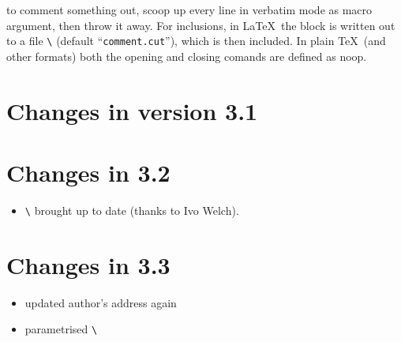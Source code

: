 \documentclass[parskip=false, DIV=8, headings=normal, pagesize=auto]{scrartcl}
\makeatletter
\newcommand*{\cs}[1]{\texttt{\textbackslash#1}}
\newcommand*{\cmd}[1]{\cs{\expandafter\@gobble\string#1}}
\newcommand*{\meta}[1]{\textlangle\textsl{#1}\textrangle}
\newcommand*{\marg}[1]{\texttt{\{}\meta{#1}\texttt{\}}}
\makeatother
\begin{document}
to comment something out, scoop up  every line in verbatim mode
as macro argument, then throw it away.
For inclusions, in \LaTeX\ the block is written out to
a file \cmd{\CommentCutFile} (default ``\texttt{comment.cut}''), which is
then included.
In plain \TeX\ (and other formats) both the opening and
closing comands are defined as noop.


\section{Changes in version 3.1}



\section{Changes in 3.2}

\begin{itemize}
\item \cmd{\specialcomment} brought up to date (thanks to Ivo Welch).
\end{itemize}


\section{Changes in 3.3}

\begin{itemize}
\item updated author's address again
\item parametrised \cmd{\CommentCutFile}
\end{itemize}
\end{document}
